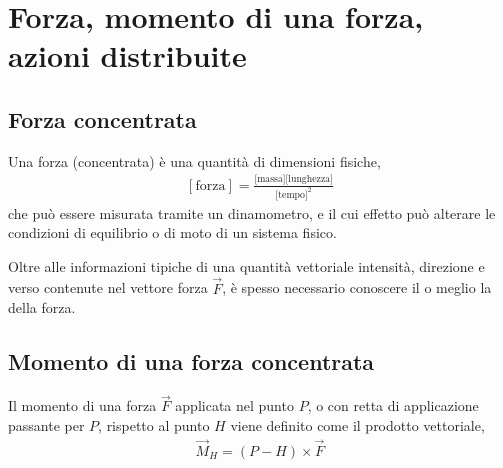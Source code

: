 \documentclass[letterpaper,10pt,italian]{jupyterBook}
\begin{document}
\sphinxstepscope




\section{Forza, momento di una forza, azioni distribuite}
\label{\detokenize{ch/mechanics/actions-types:forza-momento-di-una-forza-azioni-distribuite}}\label{\detokenize{ch/mechanics/actions-types:physics-hs-mechanics-actions-def}}\label{\detokenize{ch/mechanics/actions-types::doc}}

\subsection{Forza concentrata}
\label{\detokenize{ch/mechanics/actions-types:forza-concentrata}}\label{\detokenize{ch/mechanics/actions-types:physics-hs-mechanics-actions-def-force}}
\sphinxAtStartPar
Una forza (concentrata) è una quantità  di dimensioni fisiche,
\begin{equation*}
\begin{split}[\text{forza}] = \frac{\text{[massa]}\text{[lunghezza]}}{\text{[tempo]}^2}\end{split}
\end{equation*}
\sphinxAtStartPar
che può essere misurata tramite un dinamometro, e il cui effetto può alterare le condizioni di equilibrio o di moto di un sistema fisico.

\sphinxAtStartPar
Oltre alle informazioni tipiche di una quantità vettoriale \sphinxhyphen{} intensità, direzione e verso \sphinxhyphen{} contenute nel vettore forza \(\vec{F}\), è spesso necessario conoscere il  \sphinxhyphen{} o meglio la  \sphinxhyphen{}  della forza.


\subsection{Momento di una forza concentrata}
\label{\detokenize{ch/mechanics/actions-types:momento-di-una-forza-concentrata}}\label{\detokenize{ch/mechanics/actions-types:physics-hs-mechanics-actions-def-moment}}
\sphinxAtStartPar
Il momento di una forza \(\vec{F}\) applicata nel punto \(P\), o con retta di applicazione passante per \(P\), rispetto al punto \(H\) viene definito come il prodotto vettoriale,
\begin{equation*}
\begin{split}\vec{M}_H = (P - H) \times \vec{F}\end{split}
\end{equation*}
\end{document}
